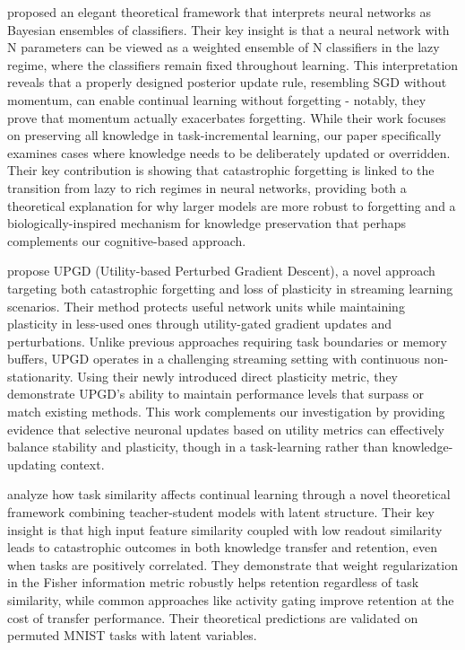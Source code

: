 \citet{benjamin2024continual} proposed an elegant theoretical framework that interprets neural networks as Bayesian ensembles of classifiers. Their key insight is that a neural network with N parameters can be viewed as a weighted ensemble of N classifiers in the lazy regime, where the classifiers remain fixed throughout learning. This interpretation reveals that a properly designed posterior update rule, resembling SGD without momentum, can enable continual learning without forgetting - notably, they prove that momentum actually exacerbates forgetting. While their work focuses on preserving all knowledge in task-incremental learning, our paper specifically examines cases where knowledge needs to be deliberately updated or overridden. Their key contribution is showing that catastrophic forgetting is linked to the transition from lazy to rich regimes in neural networks, providing both a theoretical explanation for why larger models are more robust to forgetting and a biologically-inspired mechanism for knowledge preservation that perhaps complements our cognitive-based approach.

\citet{elsayed2024addressing} propose UPGD (Utility-based Perturbed Gradient Descent), a novel approach targeting both catastrophic forgetting and loss of plasticity in streaming learning scenarios. Their method protects useful network units while maintaining plasticity in less-used ones through utility-gated gradient updates and perturbations. Unlike previous approaches requiring task boundaries or memory buffers, UPGD operates in a challenging streaming setting with continuous non-stationarity. Using their newly introduced direct plasticity metric, they demonstrate UPGD's ability to maintain performance levels that surpass or match existing methods. This work complements our investigation by providing evidence that selective neuronal updates based on utility metrics can effectively balance stability and plasticity, though in a task-learning rather than knowledge-updating context.

\citet{hiratani2024disentangling} analyze how task similarity affects continual learning through a novel theoretical framework combining teacher-student models with latent structure. Their key insight is that high input feature similarity coupled with low readout similarity leads to catastrophic outcomes in both knowledge transfer and retention, even when tasks are positively correlated. They demonstrate that weight regularization in the Fisher information metric robustly helps retention regardless of task similarity, while common approaches like activity gating improve retention at the cost of transfer performance. Their theoretical predictions are validated on permuted MNIST tasks with latent variables.

